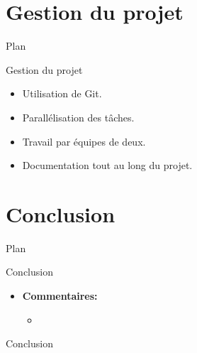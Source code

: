 \documentclass{beamer}
\begin{document}
\section{Gestion du projet}
\begin{frame}{Plan}
    \tableofcontents[currentsection]
\end{frame}

\begin{frame}{Gestion du projet}
    \begin{itemize}
        \item Utilisation de Git.
        \item Parallélisation des tâches.
        \item Travail par équipes de deux.
        \item Documentation tout au long du projet.
    \end{itemize}
\end{frame}

\section{Conclusion}
\begin{frame}{Plan}
    \tableofcontents[currentsection]
\end{frame}

\begin{frame}{Conclusion}
	\begin{itemize}
		\item \textbf{Commentaires:}
		\begin{itemize}
			\item 
		\end{itemize}
	\end{itemize}
\end{frame}

\begin{frame}{Conclusion}
\end{frame}
\end{document}
